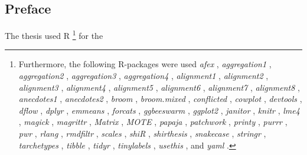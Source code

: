 \documentclass[a4paper, nobind]{templates/ociamthesis}
\newenvironment{preface}%
{   \begin{alwayssingle}\chapter*{Preface}
    \thispagestyle{empty}
    \pagestyle{empty}
    \setlength{\baselineskip}{\frontmatterbaselineskip}
  }
  {\end{alwayssingle}}
\theoremstyle{definition}
\theoremstyle{definition}
\theoremstyle{definition}
\theoremstyle{definition}
\theoremstyle{remark}
\begin{document}
\begin{romanpages}
\begin{preface}
  The thesis used R \autocite[Version 4.0.2;][]{R-base}\footnote{Furthermore, the following R-packages were used \emph{afex} \autocite[Version 0.28.1;][]{R-afex}, \emph{aggregation1} \autocite[Version 1.0;][]{R-aggregation1}, \emph{aggregation2} \autocite[Version 1.0;][]{R-aggregation2}, \emph{aggregation3} \autocite[Version 1.0;][]{R-aggregation3}, \emph{aggregation4} \autocite[Version 1.0;][]{R-aggregation4}, \emph{alignment1} \autocite[Version 1.0;][]{R-alignment1}, \emph{alignment2} \autocite[Version 1.0;][]{R-alignment2}, \emph{alignment3} \autocite[Version 1.0;][]{R-alignment3}, \emph{alignment4} \autocite[Version 1.0;][]{R-alignment4}, \emph{alignment5} \autocite[Version 1.0;][]{R-alignment5}, \emph{alignment6} \autocite[Version 1.0;][]{R-alignment6}, \emph{alignment7} \autocite[Version 1.0;][]{R-alignment7}, \emph{alignment8} \autocite[Version 1.0;][]{R-alignment8}, \emph{anecdotes1} \autocite[Version 1.0;][]{R-anecdotes1}, \emph{anecdotes2} \autocite[Version 1.0;][]{R-anecdotes2}, \emph{broom} \autocites[Version 0.7.7.9000;][]{R-broom,R-broom.mixed}, \emph{broom.mixed} \autocite[Version 0.2.6;][]{R-broom.mixed}, \emph{conflicted} \autocite[Version 1.0.4;][]{R-conflicted}, \emph{cowplot} \autocite[Version 1.1.1;][]{R-cowplot}, \emph{devtools} \autocite[Version 2.4.1;][]{R-devtools}, \emph{dflow} \autocite[Version 0.0.0.9000;][]{R-dflow}, \emph{dplyr} \autocite[Version 1.0.7.9000;][]{R-dplyr}, \emph{emmeans} \autocite[Version 1.5.4.9004;][]{R-emmeans}, \emph{forcats} \autocite[Version 0.5.1;][]{R-forcats}, \emph{ggbeeswarm} \autocite[Version 0.6.0;][]{R-ggbeeswarm}, \emph{ggplot2} \autocite[Version 3.3.4;][]{R-ggplot2}, \emph{janitor} \autocite[Version 2.1.0;][]{R-janitor}, \emph{knitr} \autocite[Version 1.33;][]{R-knitr}, \emph{lme4} \autocite[Version 1.1.27;][]{R-lme4}, \emph{magick} \autocite[Version 2.6.0;][]{R-magick}, \emph{magrittr} \autocite[Version 2.0.1;][]{R-magrittr}, \emph{Matrix} \autocite[Version 1.3.2;][]{R-Matrix}, \emph{MOTE} \autocite[Version 1.0.2;][]{R-MOTE}, \emph{papaja} \autocite[Version 0.1.0.9997;][]{R-papaja}, \emph{patchwork} \autocite[Version 1.1.1;][]{R-patchwork}, \emph{printy} \autocite[Version 0.0.0.9003;][]{R-printy}, \emph{purrr} \autocite[Version 0.3.4;][]{R-purrr}, \emph{pwr} \autocite[Version 1.3.0;][]{R-pwr}, \emph{rlang} \autocite[Version 0.4.11.9000;][]{R-rlang}, \emph{rmdfiltr} \autocite[Version 0.1.3;][]{R-rmdfiltr}, \emph{scales} \autocite[Version 1.1.1;][]{R-scales}, \emph{shiR} \autocite[Version 0.0.0.9000;][]{R-shiR}, \emph{shirthesis} \autocite[Version 0.0.0.9000;][]{R-shirthesis}, \emph{snakecase} \autocite[Version 0.11.0;][]{R-snakecase}, \emph{stringr} \autocite[Version 1.4.0;][]{R-stringr}, \emph{tarchetypes} \autocite[Version 0.2.0.9000;][]{R-tarchetypes}, \emph{tibble} \autocite[Version 3.1.2;][]{R-tibble}, \emph{tidyr} \autocite[Version 1.1.3;][]{R-tidyr}, \emph{tinylabels} \autocite[Version 0.2.1;][]{R-tinylabels}, \emph{usethis} \autocite[Version 2.0.1;][]{R-usethis}, and \emph{yaml} \autocite[Version 2.2.1;][]{R-yaml}.} for the

\end{preface}
\end{romanpages}
\end{document}
